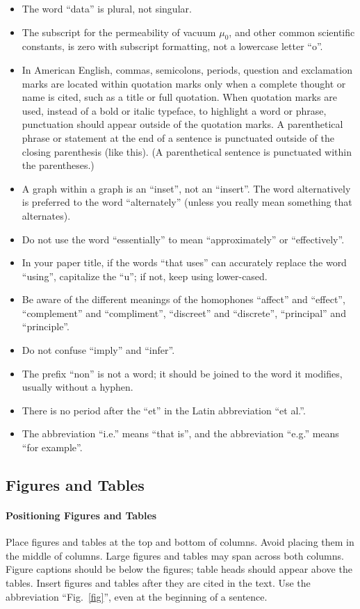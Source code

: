 \documentclass[conference]{IEEEtran}
\begin{document}
\begin{itemize}
\item The word ``data'' is plural, not singular.
\item The subscript for the permeability of vacuum $\mu_{0}$, and other common scientific constants, is zero with subscript formatting, not a lowercase letter ``o''.
\item In American English, commas, semicolons, periods, question and exclamation marks are located within quotation marks only when a complete thought or name is cited, such as a title or full quotation. When quotation marks are used, instead of a bold or italic typeface, to highlight a word or phrase, punctuation should appear outside of the quotation marks. A parenthetical phrase or statement at the end of a sentence is punctuated outside of the closing parenthesis (like this). (A parenthetical sentence is punctuated within the parentheses.)
\item A graph within a graph is an ``inset'', not an ``insert''. The word alternatively is preferred to the word ``alternately'' (unless you really mean something that alternates).
\item Do not use the word ``essentially'' to mean ``approximately'' or ``effectively''.
\item In your paper title, if the words ``that uses'' can accurately replace the word ``using'', capitalize the ``u''; if not, keep using lower-cased.
\item Be aware of the different meanings of the homophones ``affect'' and ``effect'', ``complement'' and ``compliment'', ``discreet'' and ``discrete'', ``principal'' and ``principle''.
\item Do not confuse ``imply'' and ``infer''.
\item The prefix ``non'' is not a word; it should be joined to the word it modifies, usually without a hyphen.
\item There is no period after the ``et'' in the Latin abbreviation ``et al.''.
\item The abbreviation ``i.e.'' means ``that is'', and the abbreviation ``e.g.'' means ``for example''.
\end{itemize}

\subsection{Figures and Tables}
\paragraph{Positioning Figures and Tables} Place figures and tables at the top and 
bottom of columns. Avoid placing them in the middle of columns. Large 
figures and tables may span across both columns. Figure captions should be 
below the figures; table heads should appear above the tables. Insert 
figures and tables after they are cited in the text. Use the abbreviation 
``Fig.~\ref{fig}'', even at the beginning of a sentence.
\end{document}
